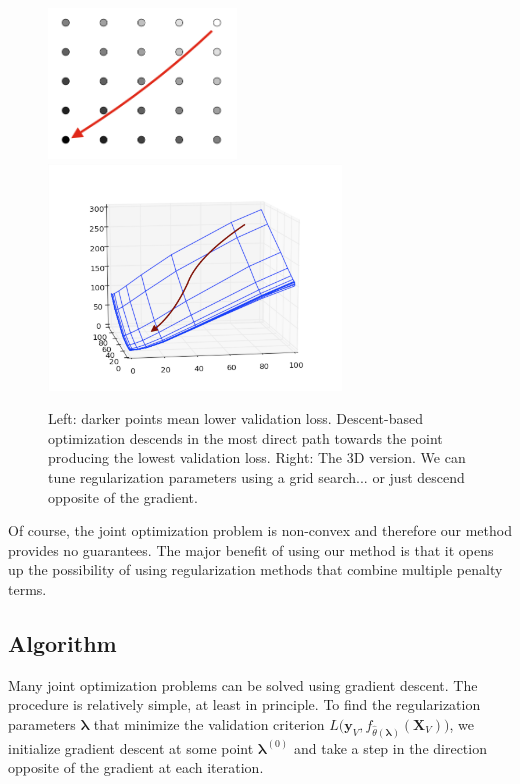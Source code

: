 \documentclass[10pt,letterpaper]{article}
\begin{document}
\begin{figure}
\begin{center}
\includegraphics[height=40mm]{grid_search_vs_descent.png}
\includegraphics[height=60mm]{surface_in_regularization_parameters.png}
\end{center}
\caption{Left: darker points mean lower validation loss. Descent-based optimization descends in the most direct path towards the point producing the lowest validation loss. Right: The 3D version. We can tune regularization parameters using a grid search... or just descend opposite of the gradient.}
\label{fig:compare}
\end{figure}

Of course, the joint optimization problem is non-convex and therefore our method provides no guarantees. The major benefit of using our method is that it opens up the possibility of using regularization methods that combine multiple penalty terms.

\subsection{Algorithm}

Many joint optimization problems can be solved using gradient descent. The procedure is relatively simple, at least in principle. To find the regularization parameters $\boldsymbol{\lambda}$ that minimize the validation criterion $L \Big( \boldsymbol{y}_V, f_{\hat{\theta}(\boldsymbol{\lambda})}(\boldsymbol{X}_V) \Big )$,
we initialize gradient descent at some point $\boldsymbol{\lambda}^{(0)}$ and take a step in the direction opposite of the gradient at each iteration.
\end{document}
